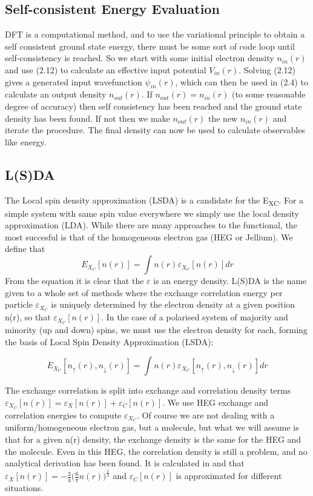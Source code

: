 \documentclass[12pt]{article}
\begin{document}
\subsection{Self-consistent Energy Evaluation}

DFT is a computational method, and to use the variational principle to obtain a self consistent ground state energy, there must be some sort of code loop until self-consistency is reached. So we start with some initial electron density $n_{in}(r)$ and use (2.12) to calculate an effective input potential $V_{in}(r)$. Solving (2.12) gives a generated input wavefunction $\psi_{in}(r)$, which can then be used in (2.4) to calculate an output density $n_{out}(r)$. If $n_{out}(r)=n_{in}(r)$ (to some reasonable degree of accuracy) then self consistency has been reached and the ground state density has been found. If not then we make $n_{out}(r)$ the new $n_{in}(r)$ and iterate the procedure. The final density can now be used to calculate observables like energy.

\subsection{L(S)DA}

The Local spin density approximation (LSDA) is a candidate for the E\textsubscript{XC}. For a simple system with same spin value everywhere we simply use the local density approximation (LDA). While there are many approaches to the functional, the most succesful is that of the homogeneous electron gas (HEG or Jellium). %
We define that
$$E_X_C[n(r)]=\int n(r) \varepsilon_X_C[n(r)] dr$$
From the equation it is clear that the $\varepsilon$ is an energy density. L(S)DA is the name given to a whole set of methods where the exchange correlation energy per particle $\varepsilon_X_C$ is uniquely determined by the electron density at a given position n(r), so that $\varepsilon_X_C[n(r)]$.
In the case of a polarised system of majority and minority (up and down) spins, we must use the electron density for each, forming the basis of Local Spin Density Approximation (LSDA):

$$E_X_C[n_\uparrow(r),n_\downarrow(r)]=\int n(r) \varepsilon_X_C[n_\uparrow(r),n_\downarrow(r)] dr$$


The exchange correlation is split into exchange and correlation density terms $\varepsilon_X_C[n(r)]=\varepsilon_X[n(r)]+\varepsilon_C[n(r)]$.
We use HEG exchange and correlation energies to compute $\varepsilon_X_C$. Of course we are not dealing with a uniform/homogeneous electron gas, but a molecule, but what we will assume is that for a given n(r) density, the exchange density is the same for the HEG and the molecule. Even in this HEG, the correlation density is still a problem, and no analytical derivation has been found. It is calculated in \cite{martin} and \cite{exc} that $\varepsilon_X[n(r)]=-\frac{3}{4}\bigg(\frac{6}{\pi}n(r)\bigg)^\frac{1}{3}$ and $\varepsilon_C[n(r)]$ is approximated for different situations.
\end{document}
